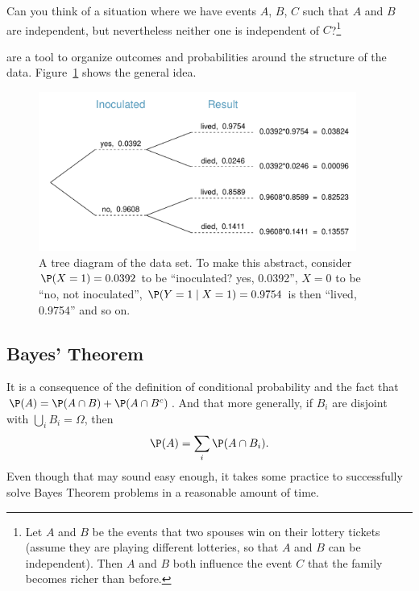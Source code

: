 \begin{exercise}
	Can you think of a situation where we have events $A$, $B$, $C$ such that $A$ and $B$ are independent, but nevertheless neither one is independent of $C$?\footnote{Let $A$ and $B$ be the events that two spouses win on their lottery tickets (assume they are playing different lotteries, so that $A$ and $B$ can be independent). Then $A$ and $B$ both influence the event $C$ that the family becomes richer than before.}
\end{exercise}


 are a tool to organize outcomes and probabilities around the structure of the data.  Figure~\ref{smallpoxTreeDiagram} shows the general idea.
\begin{figure}%
\centering
\includegraphics[width=0.93\textwidth]{ch_probability/figures/smallpoxTreeDiagram/smallpoxTreeDiagram}
\caption{A tree diagram of the  data set. To make this abstract, consider $\P(X=1)=0.0392$ to be ``inoculated? yes, 0.0392'', $X=0$ to be ``no, not inoculated'', $\P(Y=1\mid X=1)=0.9754$ is then ``lived, 0.9754'' and so on.}
\label{smallpoxTreeDiagram}
\end{figure}



\subsection{Bayes' Theorem}
\label{bayesTheoremSubsection}


It is a consequence of the definition of conditional probability and the fact that $\P(A) = \P(A\cap B) + \P(A\cap B^c)$. And that more generally, if $B_i$ are disjoint with $\bigcup_i B_i=\Omega$, then
\[
	\P(A) = \sum_i \P(A\cap B_i).
\]
Even though that may sound easy enough, it takes some practice to successfully solve Bayes Theorem problems in a reasonable amount of time.

